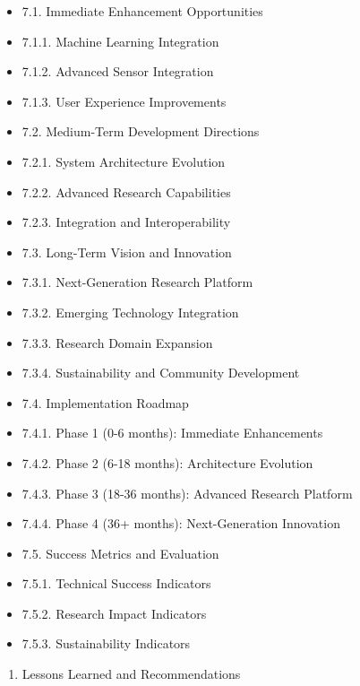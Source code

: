 \documentclass[12pt,a4paper]{report}
\begin{document}
\begin{itemize}
\item 7.1. Immediate Enhancement Opportunities
\item 7.1.1. Machine Learning Integration
\item 7.1.2. Advanced Sensor Integration
\item 7.1.3. User Experience Improvements
\item 7.2. Medium-Term Development Directions
\item 7.2.1. System Architecture Evolution
\item 7.2.2. Advanced Research Capabilities
\item 7.2.3. Integration and Interoperability
\item 7.3. Long-Term Vision and Innovation
\item 7.3.1. Next-Generation Research Platform
\item 7.3.2. Emerging Technology Integration
\item 7.3.3. Research Domain Expansion
\item 7.3.4. Sustainability and Community Development
\item 7.4. Implementation Roadmap
\item 7.4.1. Phase 1 (0-6 months): Immediate Enhancements
\item 7.4.2. Phase 2 (6-18 months): Architecture Evolution
\item 7.4.3. Phase 3 (18-36 months): Advanced Research Platform
\item 7.4.4. Phase 4 (36+ months): Next-Generation Innovation
\item 7.5. Success Metrics and Evaluation
\item 7.5.1. Technical Success Indicators
\item 7.5.2. Research Impact Indicators
\item 7.5.3. Sustainability Indicators
\end{itemize}
\begin{enumerate}
\item Lessons Learned and Recommendations
\end{enumerate}
\end{document}
